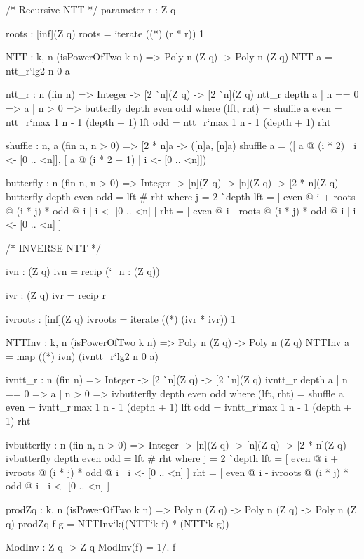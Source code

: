 \begin{code}
  /* Recursive NTT */
  parameter
    r : Z q

  roots : [inf](Z q)
  roots = iterate ((*) (r * r)) 1

  NTT : {k, n} (isPowerOfTwo k n) => Poly n (Z q) -> Poly n (Z q)
  NTT a = ntt_r`{lg2 n} 0 a

  ntt_r : {n} (fin n) =>
    Integer -> [2 ^^ n](Z q) -> [2 ^^ n](Z q)
  ntt_r depth a
    | n == 0 => a
    | n > 0 => butterfly depth even odd
      where
        (lft, rht) = shuffle a
        even = ntt_r`{max 1 n - 1} (depth + 1) lft
        odd = ntt_r`{max 1 n - 1} (depth + 1) rht

  shuffle : {n, a} (fin n, n > 0) => [2 * n]a -> ([n]a, [n]a)
  shuffle a =
    ([ a @ (i * 2) | i <- [0 .. <n]], [ a @ (i * 2 + 1) | i <- [0 .. <n]])

  butterfly : {n} (fin n, n > 0) =>
    Integer -> [n](Z q) -> [n](Z q) -> [2 * n](Z q)
  butterfly depth even odd =
    lft # rht
    where
      j = 2 ^^ depth
      lft = [ even @ i + roots @ (i * j) * odd @ i | i <- [0 .. <n] ]
      rht = [ even @ i - roots @ (i * j) * odd @ i | i <- [0 .. <n] ]
\end{code}

\begin{code}
  /* INVERSE NTT */

  ivn : (Z q)
  ivn = recip (`_n : (Z q))

  ivr : (Z q)
  ivr = recip r

  ivroots : [inf](Z q)
  ivroots = iterate ((*) (ivr * ivr)) 1

  NTTInv : {k, n} (isPowerOfTwo k n) => Poly n (Z q) -> Poly n (Z q)
  NTTInv a =
    map ((*) ivn) (ivntt_r`{lg2 n} 0 a)

  ivntt_r : {n} (fin n) => Integer -> [2 ^^ n](Z q) -> [2 ^^ n](Z q)
  ivntt_r depth a
    | n == 0 => a
    | n > 0 => ivbutterfly depth even odd
      where
        (lft, rht) = shuffle a
        even = ivntt_r`{max 1 n - 1} (depth + 1) lft
        odd = ivntt_r`{max 1 n - 1} (depth + 1) rht

  ivbutterfly : {n} (fin n, n > 0) =>
    Integer -> [n](Z q) -> [n](Z q) -> [2 * n](Z q)
  ivbutterfly depth even odd =
    lft # rht
    where
      j = 2 ^^ depth
      lft = [ even @ i + ivroots @ (i * j) * odd @ i | i <- [0 .. <n] ]
      rht = [ even @ i - ivroots @ (i * j) * odd @ i | i <- [0 .. <n] ]
\end{code}

\begin{code}
  prodZq : {k, n} (isPowerOfTwo k n) =>
    Poly n (Z q) -> Poly n (Z q) -> Poly n (Z q)
  prodZq f g = NTTInv`{k}((NTT`{k} f) * (NTT`{k} g))

  ModInv : Z q -> Z q
  ModInv(f) =  1/. f
\end{code}

